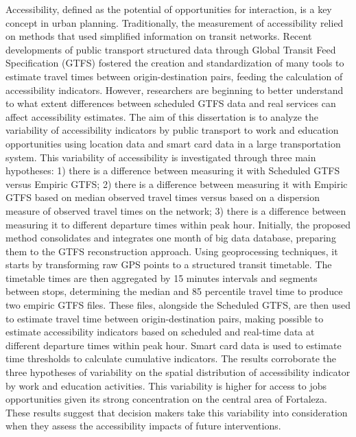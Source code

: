 Accessibility, defined as the potential of opportunities for interaction, is a key concept in urban planning. Traditionally, the measurement of accessibility relied on methods that used simplified information on transit networks. Recent developments of public transport structured data through Global Transit Feed Specification (GTFS) fostered the creation and standardization of many tools to estimate travel times between origin-destination pairs, feeding the calculation of accessibility indicators. However, researchers are beginning to better understand to what extent differences between scheduled GTFS data and real services can affect accessibility estimates. The aim of this dissertation is to analyze the variability of accessibility indicators by public transport to work and education opportunities using location data and smart card data in a large transportation system. This variability of accessibility is investigated through three main hypotheses: 1) there is a difference between measuring it with Scheduled GTFS versus Empiric GTFS;  2) there is a difference between measuring it with Empiric GTFS based on median observed travel times versus based on a dispersion measure of observed travel times on the network; 3) there is a difference between measuring it to different departure times within peak hour. Initially, the proposed method consolidates and integrates one month of big data database, preparing them to the GTFS reconstruction approach. Using geoprocessing techniques, it starts by transforming raw GPS points to a structured transit timetable. The timetable times are then aggregated by 15 minutes intervals and segments between stops, determining the median and 85 percentile travel time to produce two empiric GTFS files. These files, alongside the Scheduled GTFS, are then used to estimate travel time between origin-destination pairs, making possible to estimate accessibility indicators based on scheduled and real-time data at different departure times within peak hour. Smart card data is used to estimate time thresholds to calculate cumulative indicators. The results corroborate the three hypotheses of variability on the spatial distribution of accessibility indicator by work and education activities. This variability is higher for access to jobs opportunities given its strong concentration on the central area of Fortaleza. These results suggest that decision makers take this variability into consideration when they assess the accessibility impacts of future interventions.

